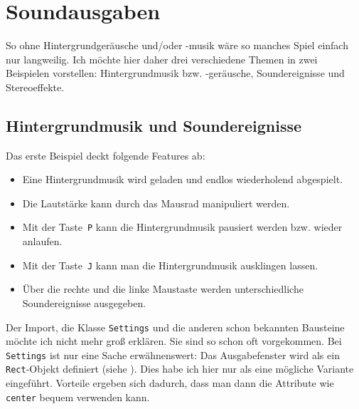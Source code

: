 \section{Soundausgaben}
So ohne Hintergrundgeräusche und/oder -musik wäre so manches Spiel einfach nur langweilig. Ich möchte hier daher drei verschiedene Themen in zwei Beispielen vorstellen: Hintergrundmusik bzw. -geräusche, Soundereignisse und Stereoeffekte.

\subsection{Hintergrundmusik und Soundereignisse}

Das erste Beispiel deckt folgende Features ab:
\begin{itemize}
	\item Eine Hintergrundmusik wird geladen und endlos wiederholend abgespielt.
	
	\item Die Lautstärke kann durch das Mausrad manipuliert werden. 
	
	\item Mit der Taste~\texttt{P} kann die Hintergrundmusik pausiert werden bzw. wieder anlaufen.
	
	\item Mit der Taste~\texttt{J} kann man die Hintergrundmusik ausklingen lassen.
	
	\item Über die rechte und die linke Maustaste werden unterschiedliche Soundereignisse ausgegeben.
\end{itemize}

Der Import, die Klasse \texttt{Settings} und die anderen schon bekannten Bausteine möchte ich nicht mehr groß erklären. Sie sind so schon oft vorgekommen. Bei \texttt{Settings} ist nur eine Sache erwähnenswert: Das Ausgabefenster wird als ein \texttt{Rect}-Objekt definiert (siehe ). Dies habe ich hier nur als eine mögliche Variante eingeführt. Vorteile ergeben sich dadurch, dass man dann die Attribute wie \texttt{center} bequem verwenden kann.


